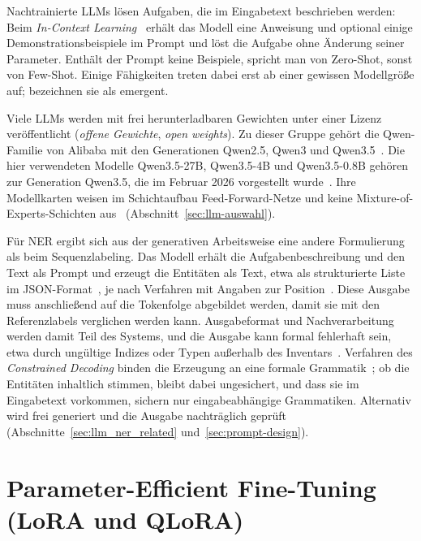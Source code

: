 Nachtrainierte LLMs lösen Aufgaben, die im Eingabetext beschrieben
werden: Beim \emph{In-Context Learning}~\cite{brown2020language} erhält
das Modell eine Anweisung und optional einige
Demonstrationsbeispiele im Prompt und löst die Aufgabe ohne Änderung
seiner Parameter.
Enthält der Prompt keine Beispiele, spricht man von Zero-Shot, sonst von
Few-Shot.
Einige Fähigkeiten treten dabei erst ab einer gewissen Modellgröße auf;
\textcite{wei2022emergent} bezeichnen sie als emergent.

Viele LLMs werden mit frei herunterladbaren Gewichten unter einer
Lizenz veröffentlicht (\emph{offene Gewichte}, \emph{open weights}).
Zu dieser Gruppe gehört die Qwen-Familie von Alibaba mit den Generationen
Qwen2.5, Qwen3 und Qwen3.5~\cite{qwen2024qwen25,qwen2025qwen3}.
Die hier verwendeten Modelle Qwen3.5-27B, Qwen3.5-4B und Qwen3.5-0.8B
gehören zur Generation Qwen3.5, die im Februar 2026 vorgestellt
wurde~\cite{qwen2026qwen35blog}.
Ihre Modellkarten weisen im Schichtaufbau Feed-Forward-Netze und keine
Mixture-of-Experts-Schichten aus~\cite{qwen2026card27b,qwen2026card4b,qwen2026card08b}
(Abschnitt~\ref{sec:llm-auswahl}).

Für NER ergibt sich aus der generativen Arbeitsweise eine andere
Formulierung als beim Sequenzlabeling.
Das Modell erhält die Aufgabenbeschreibung und den Text als Prompt und
erzeugt die Entitäten als Text, etwa als strukturierte Liste im
JSON-Format~\cite{dagdelen2024structuredIE}, je nach Verfahren mit
Angaben zur Position~\cite[Abschn.~3.2]{semin2026spanLabeling}.
Diese Ausgabe muss anschließend auf die Tokenfolge abgebildet werden,
damit sie mit den Referenzlabels verglichen werden kann.
Ausgabeformat und Nachverarbeitung werden damit Teil des Systems, und
die Ausgabe kann formal fehlerhaft sein, etwa durch ungültige Indizes
oder Typen außerhalb des Inventars~\cite{semin2026spanLabeling}.
Verfahren des \emph{Constrained Decoding} binden die Erzeugung an eine
formale Grammatik~\cite{geng2023grammar}; ob die Entitäten inhaltlich
stimmen, bleibt dabei ungesichert, und dass sie im Eingabetext
vorkommen, sichern nur eingabeabhängige Grammatiken.
Alternativ wird frei generiert und die Ausgabe nachträglich geprüft
(Abschnitte~\ref{sec:llm_ner_related} und~\ref{sec:prompt-design}).

\section{Parameter-Efficient Fine-Tuning (LoRA und QLoRA)}
\label{sec:lora}

